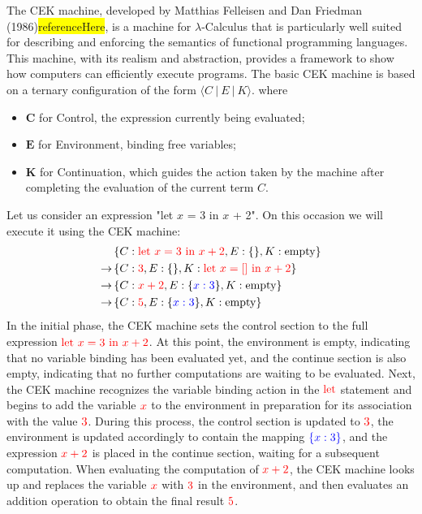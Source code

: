 \documentclass{l4proj}
\begin{document}
The CEK machine, developed by Matthias Felleisen and Dan Friedman (1986)\colorbox{yellow}{referenceHere}, is a machine for $\lambda$-Calculus that is particularly well suited for describing and enforcing the semantics of functional programming languages. This machine, with its realism and abstraction, provides a framework to show how computers can efficiently execute programs. The basic CEK machine is based on a ternary configuration of the form $⟨C\:|\:E\:|\:K⟩$. where
\begin{itemize}
    \item $\textbf{C}$ for Control, the expression currently being evaluated;
    \item $\textbf{E}$ for Environment, binding free variables;
    \item $\textbf{K}$ for Continuation, which guides the action taken by the machine after completing the evaluation of the current term $C$.
\end{itemize}
Let us consider an expression "let $x$ = 3 in $x$ + 2". On this occasion we will execute it using the CEK machine:
\begin{align*}
& \left\{C: \textcolor{red}{\text{let } x = 3 \text{ in } x + 2}, E: \{\}, K: \text{empty}\right\} \\
\rightarrow & \left\{C: \textcolor{red}{3}, E: \{\}, K: \textcolor{red}{\text{let } x = [] \text{ in } x + 2}\right\} \\
\rightarrow & \left\{C: \textcolor{red}{x + 2}, E: \{\textcolor{blue}{x: 3}\}, K: \text{empty}\right\} \\
\rightarrow & \left\{C: \textcolor{red}{5}, E: \{\textcolor{blue}{x: 3}\}, K: \text{empty}\right\}
\end{align*}
In the initial phase, the CEK machine sets the control section to the full expression $\color{red}{\text{let } x = 3 \text{ in } x + 2}$. At this point, the environment is empty, indicating that no variable binding has been evaluated yet, and the continue section is also empty, indicating that no further computations are waiting to be evaluated. Next, the CEK machine recognizes the variable binding action in the $\color{red}{\text{let}}$ statement and begins to add the variable $\color{red}{x}$ to the environment in preparation for its association with the value $\color{red}{3}$. During this process, the control section is updated to $\color{red}{3}$, the environment is updated accordingly to contain the mapping $\color{blue}{\{x: 3\}}$, and the expression $\color{red}{x + 2}$ is placed in the continue section, waiting for a subsequent computation. When evaluating the computation of $\color{red}{x + 2}$, the CEK machine looks up and replaces the variable $\color{red}{x}$ with $\color{red}{3}$ in the environment, and then evaluates an addition operation to obtain the final result $\color{red}{5}$.
\end{document}
